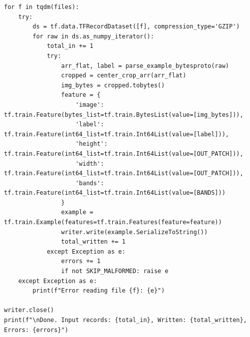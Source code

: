 \documentclass[12pt,a4paper]{report}
\begin{document}
\begin{lstlisting}
for f in tqdm(files):
    try:
        ds = tf.data.TFRecordDataset([f], compression_type='GZIP')
        for raw in ds.as_numpy_iterator():
            total_in += 1
            try:
                arr_flat, label = parse_example_bytesproto(raw)
                cropped = center_crop_arr(arr_flat)
                img_bytes = cropped.tobytes()
                feature = {
                    'image': tf.train.Feature(bytes_list=tf.train.BytesList(value=[img_bytes])),
                    'label': tf.train.Feature(int64_list=tf.train.Int64List(value=[label])),
                    'height': tf.train.Feature(int64_list=tf.train.Int64List(value=[OUT_PATCH])),
                    'width': tf.train.Feature(int64_list=tf.train.Int64List(value=[OUT_PATCH])),
                    'bands': tf.train.Feature(int64_list=tf.train.Int64List(value=[BANDS]))
                }
                example = tf.train.Example(features=tf.train.Features(feature=feature))
                writer.write(example.SerializeToString())
                total_written += 1
            except Exception as e:
                errors += 1
                if not SKIP_MALFORMED: raise e
    except Exception as e:
        print(f"Error reading file {f}: {e}")

writer.close()
print(f"\nDone. Input records: {total_in}, Written: {total_written}, Errors: {errors}")
\end{lstlisting}
\end{document}
